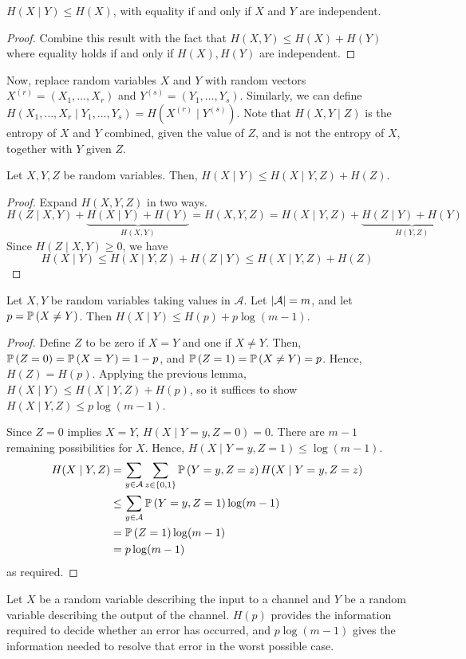 \begin{corollary}
    \( H(X\mid Y) \leq H(X) \), with equality if and only if \( X \) and \( Y \) are independent.
\end{corollary}
\begin{proof}
    Combine this result with the fact that \( H(X,Y) \leq H(X) + H(Y) \) where equality holds if and only if \( H(X), H(Y) \) are independent.
\end{proof}
Now, replace random variables \( X \) and \( Y \) with random vectors \( X^{(r)} = (X_1, \dots, X_r) \) and \( Y^{(s)} = (Y_1, \dots, Y_s) \).
Similarly, we can define \( H(X_1, \dots, X_r \mid Y_1, \dots, Y_s) = H(X^{(r)} \mid Y^{(s)}) \).
Note that \( H(X,Y\mid Z) \) is the entropy of \( X \) and \( Y \) combined, given the value of \( Z \), and is not the entropy of \( X \), together with \( Y \) given \( Z \).
\begin{lemma}
    Let \( X, Y, Z \) be random variables.
    Then, \( H(X \mid Y) \leq H(X \mid Y, Z) + H(Z) \).
\end{lemma}
\begin{proof}
    Expand \( H(X,Y,Z) \) in two ways.
    \[ H(Z \mid X,Y) + \underbrace{H(X\mid Y) + H(Y)}_{H(X,Y)} = H(X,Y,Z) = H(X \mid Y,Z) + \underbrace{H(Z \mid Y) + H(Y)}_{H(Y,Z)} \]
    Since \( H(Z \mid X,Y) \geq 0 \), we have
    \[ H(X \mid Y) \leq H(X \mid Y,Z) + H(Z \mid Y) \leq H(X \mid Y,Z) + H(Z) \]
\end{proof}
\begin{proposition}
    Let \( X, Y \) be random variables taking values in \( \mathcal A \).
    Let \( \abs{\mathcal A} = m \), and let \( p = \mathbb{P}\left({X \neq Y}\right) \).
    Then \( H(X \mid Y) \leq H(p) + p \log(m-1) \).
\end{proposition}
\begin{proof}
    Define \( Z \) to be zero if \( X = Y \) and one if \( X \neq Y \).
    Then, \( \mathbb{P}\left({Z = 0}\right) = \mathbb{P}\left({X = Y}\right) = 1 - p \), and \( \mathbb{P}\left({Z = 1}\right) = \mathbb{P}\left({X \neq Y}\right) = p \).
    Hence, \( H(Z) = H(p) \).
    Applying the previous lemma, \( H(X \mid Y) \leq H(X \mid Y, Z) + H(p) \), so it suffices to show \( H(X \mid Y, Z) \leq p\log(m-1) \).

    Since \( Z = 0 \) implies \( X = Y \), \( H(X \mid Y = y, Z = 0) = 0 \).
    There are \( m - 1 \) remaining possibilities for \( X \).
    Hence, \( H(X \mid Y = y, Z = 1) \leq \log(m-1) \).
    \begin{align*}
        H(X \mid Y, Z) &= \sum_{y \in \mathcal A} \sum_{z \in \qty{0,1}} \mathbb{P}\left({Y = y, Z = z}\right) H(X \mid Y = y, Z = z) \\
        &\leq \sum_{y \in \mathcal A} \mathbb{P}\left({Y = y, Z = 1}\right) \log(m-1) \\
        &= \mathbb{P}\left({Z = 1}\right) \log (m-1) \\
        &= p\log(m-1)
    \end{align*}
    as required.
\end{proof}
Let \( X \) be a random variable describing the input to a channel and \( Y \) be a random variable describing the output of the channel.
\( H(p) \) provides the information required to decide whether an error has occurred, and \( p\log(m-1) \) gives the information needed to resolve that error in the worst possible case.

